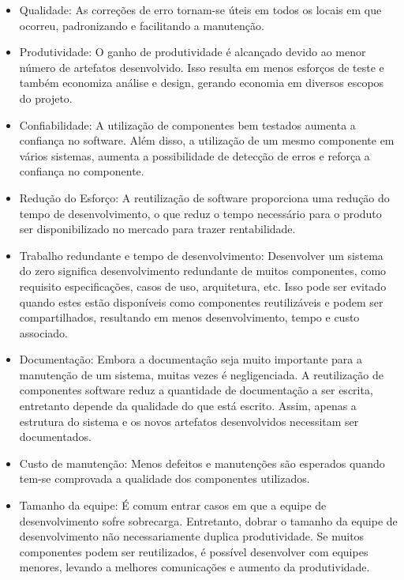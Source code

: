 \begin{itemize}

\item Qualidade: As correções de erro tornam-se úteis em todos os locais em que ocorreu, padronizando e facilitando a manutenção.

\item Produtividade: O ganho de produtividade é alcançado devido ao menor número de artefatos desenvolvido. Isso resulta em menos esforços de teste e também economiza análise e design, gerando economia em diversos escopos do projeto.

\item Confiabilidade: A utilização de componentes bem testados aumenta a
confiança no software. Além disso, a utilização de um mesmo componente em vários sistemas, aumenta a possibilidade de detecção de erros e reforça a confiança no componente.

\item Redução do Esforço: A reutilização de software proporciona uma redução do tempo de desenvolvimento, o que reduz o tempo necessário para o produto ser disponibilizado no mercado para trazer rentabilidade.

\item Trabalho redundante e tempo de desenvolvimento: Desenvolver um sistema do
zero significa desenvolvimento redundante de muitos componentes, como requisito
especificações, casos de uso, arquitetura, etc. Isso pode ser evitado quando estes estão disponíveis como componentes reutilizáveis e podem ser compartilhados, resultando em menos desenvolvimento, tempo e custo associado.

\item Documentação: Embora a documentação seja muito importante para a
manutenção de um sistema, muitas vezes é negligenciada. A reutilização de componentes software reduz a quantidade de documentação a ser escrita, entretanto depende da qualidade do que está escrito. Assim, apenas a estrutura do sistema e os novos artefatos desenvolvidos necessitam ser documentados.

\item Custo de manutenção: Menos defeitos e manutenções são esperados quando tem-se comprovada a qualidade dos componentes utilizados.

\item Tamanho da equipe: É comum entrar casos em que a equipe de desenvolvimento sofre sobrecarga. Entretanto, dobrar o tamanho da equipe de desenvolvimento não necessariamente duplica produtividade. Se muitos componentes podem ser reutilizados, é possível desenvolver com equipes menores, levando a melhores comunicações e aumento da produtividade.

\end{itemize}

